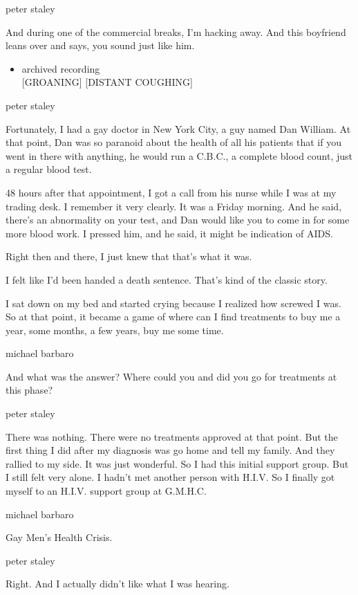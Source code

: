 peter staley

And during one of the commercial breaks, I'm hacking away. And this
boyfriend leans over and says, you sound just like him.

\begin{itemize}
\tightlist
\item
  archived recording\\
  {[}GROANING{]} {[}DISTANT COUGHING{]}
\end{itemize}

peter staley

Fortunately, I had a gay doctor in New York City, a guy named Dan
William. At that point, Dan was so paranoid about the health of all his
patients that if you went in there with anything, he would run a C.B.C.,
a complete blood count, just a regular blood test.

48 hours after that appointment, I got a call from his nurse while I was
at my trading desk. I remember it very clearly. It was a Friday morning.
And he said, there's an abnormality on your test, and Dan would like you
to come in for some more blood work. I pressed him, and he said, it
might be indication of AIDS.

Right then and there, I just knew that that's what it was.

I felt like I'd been handed a death sentence. That's kind of the classic
story.

I sat down on my bed and started crying because I realized how screwed I
was. So at that point, it became a game of where can I find treatments
to buy me a year, some months, a few years, buy me some time.

michael barbaro

And what was the answer? Where could you and did you go for treatments
at this phase?

peter staley

There was nothing. There were no treatments approved at that point. But
the first thing I did after my diagnosis was go home and tell my family.
And they rallied to my side. It was just wonderful. So I had this
initial support group. But I still felt very alone. I hadn't met another
person with H.I.V. So I finally got myself to an H.I.V. support group at
G.M.H.C.

michael barbaro

Gay Men's Health Crisis.

peter staley

Right. And I actually didn't like what I was hearing.

